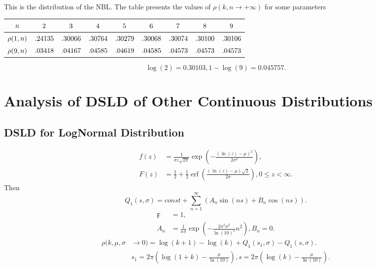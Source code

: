 \documentclass[titlepage,fleqn]{article}%
\begin{document}
This is the distribution of the NBL. The table presents the values of
$\rho(k,n\rightarrow+\infty)$ for some parameters%

\begin{tabular}
[c]{|c|c|c|c|c|c|c|c|c|}\hline\hline
${\small n}$ & ${\small 2}$ & ${\small 3}$ & ${\small 4}$ & ${\small 5}$ &
${\small 6}$ & ${\small 7}$ & ${\small 8}$ & ${\small 9}$\\\hline
${\small \rho(1,n)}$ & ${\small .24135}$ & ${\small .30066}$ &
${\small .30764}$ & ${\small .30279}$ & ${\small .30068}$ & ${\small .30074}$
& ${\small .30100}$ & ${\small .30106}$\\\hline
${\small \rho(9,n)}$ & ${\small .03418}$ & ${\small .04167}$ &
${\small .04585}$ & ${\small .04619}$ & ${\small .04585}$ & ${\small .04573}$
& ${\small .04573}$ & ${\small .04573}$\\\hline\hline
\end{tabular}
%

\[
\log(2)=0.30103,1-\log(9)=0.045757.
\]


\section{Analysis of DSLD of Other Continuous Distributions}%

\label{OtherContDist}%


\subsection{DSLD for LogNormal Distribution}%

\label{LogNormDist}%
\begin{align*}
f(z)  &  =\frac{1}{\sigma z\sqrt{2\pi}}\exp\left(  -\frac{\left(  \ln
(z)-\mu\right)  ^{2}}{2\sigma^{2}}\right)  ,\\
F(z)  &  =\frac{1}{2}+\frac{1}{2}\operatorname{erf}\left(  \frac{\left(
\ln(z)-\mu\right)  \sqrt{2}}{2\sigma}\right)  ,0\leq z<\infty.
\end{align*}
Then%
\begin{equation}
Q_{1}\left(  s,\sigma\right)  =const+%
{\displaystyle\sum\limits_{n=1}^{\infty}}
\left(  A_{n}\sin\left(  ns\right)  +B_{n}\cos\left(  ns\right)  \right)  .
\label{LogNorm1}%
\end{equation}%
\begin{align*}
\digamma &  =1,\\
A_{n}  &  =\frac{1}{n\pi}\exp\left(  -\frac{2\pi^{2}\sigma^{2}}{\ln(10)^{2}%
}n^{2}\right)  ,B_{n}=0.
\end{align*}%
\begin{align}
\rho(k,\mu,\sigma &  \rightarrow0)=\log(k+1)-\log(k)+Q_{1}\left(  s_{1}%
,\sigma\right)  -Q_{1}\left(  s,\sigma\right)  .\label{LogNorm2}\\
&  s_{1}=2\pi\left(  \log(1+k)-\frac{\mu}{\ln(10)}\right)  ,s=2\pi\left(
\log(k)-\frac{\mu}{\ln(10)}\right)  .\nonumber
\end{align}
\end{document}
